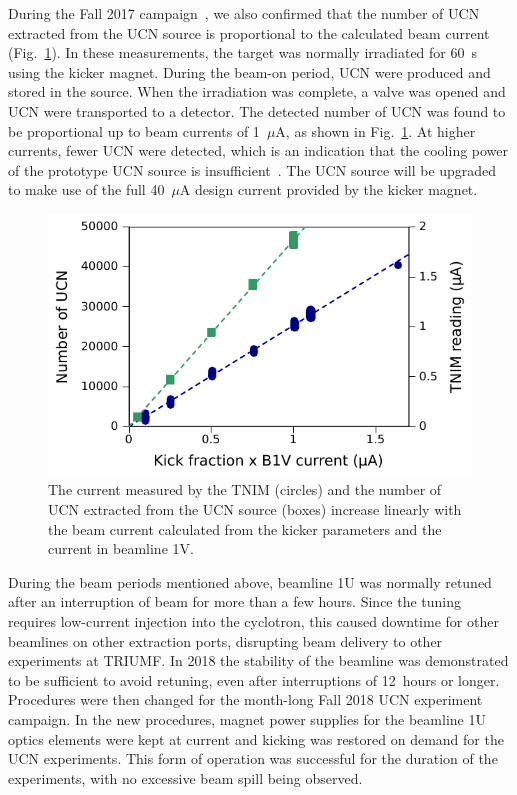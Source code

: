 \documentclass[aps,prab,twocolumn,superscriptaddress]{revtex4-1}
\begin{document}
During the Fall 2017 campaign~\cite{UCNprod}, we also confirmed that the number of UCN extracted from the UCN source is proportional to the calculated beam current (Fig.~\ref{fig:TNIMreading}).  In these measurements, the target was normally irradiated for 60~s using the kicker magnet.  During the beam-on period, UCN were produced and stored in the source.  When the irradiation was complete, a valve was opened and UCN were transported to a detector.  The detected number of UCN was found to be proportional up to beam currents of 1~$\mu$A, as shown in Fig.~\ref{fig:TNIMreading}.  At higher currents, fewer UCN were detected, which is an indication that the cooling power of the prototype UCN source is insufficient~\cite{UCNprod}.  The UCN source will be upgraded to make use of the full 40~$\mu$A design current provided by the kicker magnet.
\begin{figure}%
\includegraphics[width=\linewidth]{TNIMcommissioning_20180911.pdf}
\caption{The current measured by the TNIM (circles) and the number of UCN extracted from the UCN source (boxes) increase linearly with the beam current calculated from the kicker parameters and the current in beamline 1V.}
\label{fig:TNIMreading}
\end{figure}

During the beam periods mentioned above, beamline 1U was normally retuned after an interruption of beam for more than a few hours.
Since the tuning requires low-current injection into the cyclotron, this caused downtime for other beamlines on other extraction ports, disrupting beam delivery to other experiments at TRIUMF.
In 2018 the stability of the beamline was demonstrated to be sufficient to avoid retuning, even after interruptions of 12~hours or longer.
Procedures were then changed for the month-long Fall 2018 UCN experiment campaign.  In the new procedures, magnet power supplies for the beamline 1U optics elements were kept at current and kicking was restored on demand for the UCN experiments.
This form of operation was successful for the duration of the experiments, with no excessive beam spill being observed.
\end{document}
